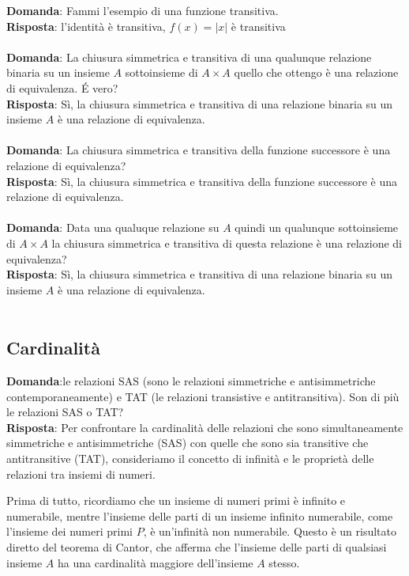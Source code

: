 \documentclass{article}
\begin{document}
\textbf{Domanda}: Fammi l'esempio di una funzione transitiva. \\
\textbf{Risposta}:  l'identità è transitiva, $f(x)=|x|$ è transitiva \\ \\
\textbf{Domanda}: La chiusura simmetrica e transitiva di una qualunque relazione binaria su un insieme $A$ sottoinsieme di $A \times A$ quello che ottengo è una relazione di equivalenza. \'E vero? \\
\textbf{Risposta}: Sì, la chiusura simmetrica e transitiva di una relazione binaria su un insieme $A$ è una relazione di equivalenza. \\ \\
\textbf{Domanda}: La chiusura simmetrica e transitiva della funzione successore è una relazione di equivalenza? \\
\textbf{Risposta}: Sì, la chiusura simmetrica e transitiva della funzione successore è una relazione di equivalenza. \\ \\
\textbf{Domanda}: Data una qualuque relazione su $A$ quindi un qualunque sottoinsieme di $A \times A$ la chiusura simmetrica e transitiva di questa relazione è una relazione di equivalenza? \\
\textbf{Risposta}: Sì, la chiusura simmetrica e transitiva di una relazione binaria su un insieme $A$ è una relazione di equivalenza. \\ \\



\subsection{Cardinalità}
\textbf{Domanda}:le relazioni SAS (sono le relazioni simmetriche e antisimmetriche contemporaneamente) e TAT (le relazioni transistive e antitransitiva). Son di più le relazioni SAS o TAT? \\
\textbf{Risposta}: Per confrontare la cardinalità delle relazioni che sono simultaneamente simmetriche e antisimmetriche (SAS) con quelle che sono sia transitive che antitransitive (TAT), consideriamo il concetto di infinità e le proprietà delle relazioni tra insiemi di numeri.

Prima di tutto, ricordiamo che un insieme di numeri primi è infinito e numerabile, mentre l'insieme delle parti di un insieme infinito numerabile, come l'insieme dei numeri primi \(P\), è un'infinità non numerabile. Questo è un risultato diretto del teorema di Cantor, che afferma che l'insieme delle parti di qualsiasi insieme \(A\) ha una cardinalità maggiore dell'insieme \(A\) stesso.
\end{document}
